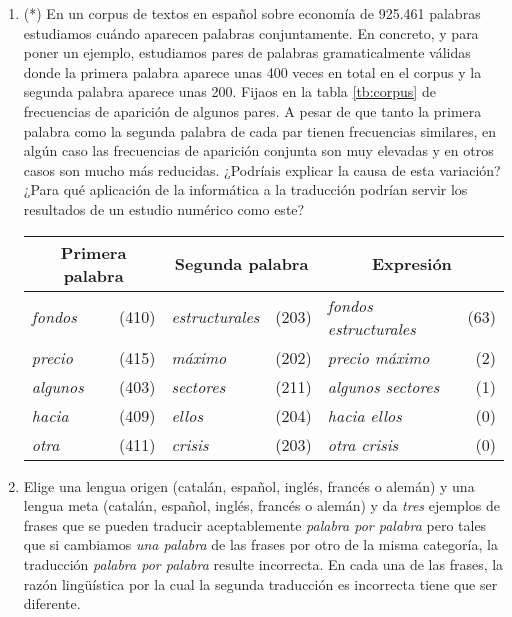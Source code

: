 \begin{enumerate}
\item (*) En un corpus de textos en español sobre economía de 925.461 palabras estudiamos cuándo aparecen palabras conjuntamente. En concreto, y para poner un ejemplo, estudiamos pares de palabras gramaticalmente válidas donde la primera palabra aparece unas 400 veces en total en el corpus y la segunda palabra  aparece unas 200. Fijaos en la tabla \ref{tb:corpus} de frecuencias de aparición de algunos pares. A pesar de que tanto la primera palabra como la segunda palabra de cada par tienen frecuencias similares, en algún caso las frecuencias de aparición conjunta son muy elevadas y en otros casos son mucho más reducidas. ¿Podríais explicar la causa de esta variación? ¿Para qué aplicación de la informática a la traducción podrían servir los resultados de un estudio numérico como este? \begin{table*} \begin{center} \begin{tabular}{lr|lr|lr} \hline\hline \multicolumn{2}{c|}{\textsf{Primera palabra}} &\multicolumn{2}{c|}{\textsf{Segunda palabra}} &\multicolumn{2}{c}{\textsf{Expresión}} \\ \hline

\emph{fondos} &(410) &\emph{estructurales} &(203) &\emph{fondos estructurales} &(63) \\ \emph{precio} &(415) &\emph{máximo} &(202) &\emph{precio máximo} &(2) \\ \emph{algunos} &(403) &\emph{sectores} &(211) &\emph{algunos sectores} &(1) \\ \emph{hacia} &(409) &\emph{ellos} &(204) &\emph{hacia ellos} &(0) \\ \emph{otra} &(411) &\emph{crisis} &(203) &\emph{otra crisis} &(0) \\ \hline

\end{tabular} \end{center} \caption{Frecuencias de aparición de pares de palabras sobre economía.} \label{tb:corpus} \end{table*} 

\item Elige una lengua origen (catalán, español, inglés, francés o alemán) y una lengua meta (catalán, español, inglés, francés o alemán) y da \emph{tres} ejemplos de frases que se pueden traducir aceptablemente \emph{palabra por palabra} pero tales que si cambiamos \emph{una palabra} de las frases por otro de la misma categoría, la traducción \emph{palabra por palabra} resulte incorrecta. En cada una de las frases, la razón lingüística por la cual la segunda traducción es incorrecta tiene que ser diferente. 


\end{enumerate}
